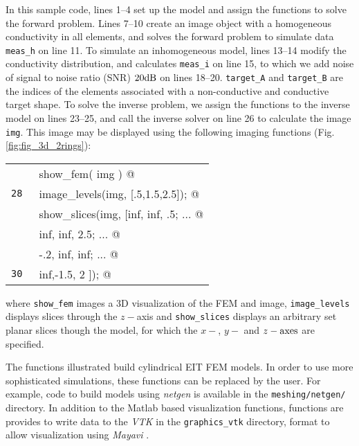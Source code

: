 \documentclass[12pt]{iopart}
\makeatletter
\newcommand{\CN}{\tt\small} %
\newcommand{\CC}{&\verb@}   % start code
\makeatother
\begin{document}
In this sample code, lines 1--4 set up the model and assign
the functions to solve the forward problem.
Lines 7--10 create an image object with a homogeneous
conductivity in all elements, and solves the forward
problem to simulate data {\tt meas\_h} on line 11. To simulate an
inhomogeneous model, lines 13--14 modify the conductivity
distribution, and calculates {\tt meas\_i} on line 15,
to which we add noise of signal to noise ratio (SNR) $20\rm dB$
on lines 18--20.
{\tt target\_A} and {\tt target\_B} are the indices of the 
elements associated with a non-conductive and conductive
target shape.
To solve the inverse problem, we assign the functions to
the inverse model on lines 23--25, and call the inverse solver
on line 26 to calculate the image {\tt img}. This image
may be displayed using the following imaging functions
(Fig. \ref{fig:fig_3d_2rings}):

\begin{tabular}{ll}
\CN    \CC show_fem( img ) @\\
\CN 28 \CC image_levels(img, [.5,1.5,2.5]); @\\
\CN    \CC show_slices(img, [inf, inf, .5; ... @\\
\CN    \CC                   inf, inf, 2.5; ... @\\
\CN    \CC                   -.2, inf, inf; ... @\\
\CN 30 \CC                   inf,-1.5,   2 ]); @\\
\end{tabular}

where {\tt show\_fem} images a 3D visualization of the
FEM and image, {\tt image\_levels} displays slices through
the $z-$axis and {\tt show\_slices} displays an
arbitrary set planar slices though the model, for which the
$x-$, $y-$ and $z-\rm axes$ are specified.

The functions illustrated
build cylindrical EIT FEM models. In order to use more
sophisticated simulations, these functions can be replaced
by the user. For example, code to build models using {\em netgen}
\cite{Schoberl_1997}  is available in the
{\tt meshing/netgen/} directory.
In addition to the Matlab based visualization functions,
functions are provides to write data to the {\em VTK}
in the {\tt graphics\_vtk} directory,
format to allow visualization using {\em Mayavi}
\cite{Ramachandran_2003}.
\end{document}
